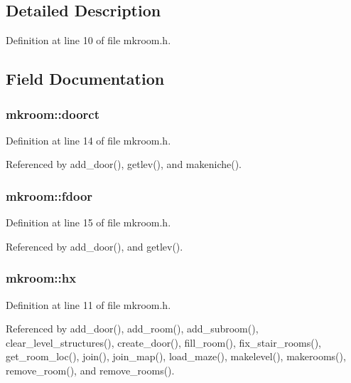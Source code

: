 \subsection{Detailed Description}


Definition at line 10 of file mkroom.\+h.



\subsection{Field Documentation}
\hypertarget{structmkroom_af3299bfffb84e2a7cd1a07b4de7c1b53}{
\subsubsection[{doorct}]{ mkroom\+::doorct}}\label{structmkroom_af3299bfffb84e2a7cd1a07b4de7c1b53}


Definition at line 14 of file mkroom.\+h.



Referenced by add\+\_\+door(), getlev(), and makeniche().

\hypertarget{structmkroom_ae40f76bfb5e37b9315e11abc5517b9d4}{
\subsubsection[{fdoor}]{ mkroom\+::fdoor}}\label{structmkroom_ae40f76bfb5e37b9315e11abc5517b9d4}


Definition at line 15 of file mkroom.\+h.



Referenced by add\+\_\+door(), and getlev().

\hypertarget{structmkroom_a1b738b591a7735add2af6d918c556543}{
\subsubsection[{hx}]{ mkroom\+::hx}}\label{structmkroom_a1b738b591a7735add2af6d918c556543}


Definition at line 11 of file mkroom.\+h.



Referenced by add\+\_\+door(), add\+\_\+room(), add\+\_\+subroom(), clear\+\_\+level\+\_\+structures(), create\+\_\+door(), fill\+\_\+room(), fix\+\_\+stair\+\_\+rooms(), get\+\_\+room\+\_\+loc(), join(), join\+\_\+map(), load\+\_\+maze(), makelevel(), makerooms(), remove\+\_\+room(), and remove\+\_\+rooms().

